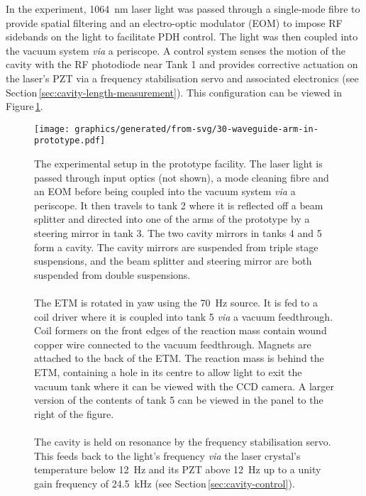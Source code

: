 In the experiment, \SI{1064}{\nano\meter} laser light was passed through a single-mode fibre to provide spatial filtering and an electro-optic modulator (\gls{EOM}) to impose RF sidebands on the light to facilitate \gls{PDH} control. The light was then coupled into the vacuum system \emph{via} a periscope. A control system senses the motion of the cavity with the RF photodiode near Tank 1 and provides corrective actuation on the laser's \gls{PZT} via a frequency stabilisation servo and associated electronics (see Section\,\ref{sec:cavity-length-measurement}). This configuration can be viewed in Figure\,\ref{fig:prototype-setup}.

\begin{figure}
  \centering
  \texttt{[image: graphics/generated/from-svg/30-waveguide-arm-in-prototype.pdf]}
  \caption{\label{fig:prototype-setup}The experimental setup in the prototype facility. The laser light is passed through input optics (not shown), a mode cleaning fibre and an EOM before being coupled into the vacuum system \emph{via} a periscope. It then travels to tank 2 where it is reflected off a beam splitter and directed into one of the arms of the prototype by a steering mirror in tank 3. The two cavity mirrors in tanks 4 and 5 form a \FP{} cavity. The cavity mirrors are suspended from triple stage suspensions, and the beam splitter and steering mirror are both suspended from double suspensions. \\
  \\The \gls{ETM} is rotated in yaw using the \SI{70}{\hertz} source. It is fed to a coil driver where it is coupled into tank 5 \emph{via} a vacuum feedthrough. Coil formers on the front edges of the reaction mass contain wound copper wire connected to the vacuum feedthrough. Magnets are attached to the back of the \gls{ETM}. The reaction mass is behind the \gls{ETM}, containing a hole in its centre to allow light to exit the vacuum tank where it can be viewed with the CCD camera. A larger version of the contents of tank 5 can be viewed in the panel to the right of the figure. \\
  \\The cavity is held on resonance by the frequency stabilisation servo. This feeds back to the light's frequency \emph{via} the laser crystal's temperature below \SI{12}{\hertz} and its PZT above \SI{12}{\hertz} up to a unity gain frequency of \SI{24.5}{\kilo \hertz} (see Section\,\ref{sec:cavity-control}).}
\end{figure}

